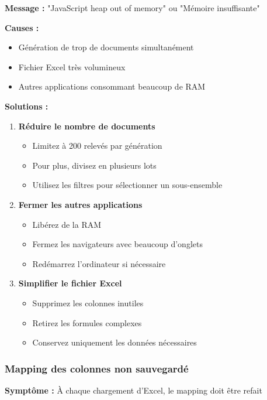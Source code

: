 \textbf{Message :} "JavaScript heap out of memory" ou "Mémoire insuffisante"

\textbf{Causes :}
\begin{itemize}[leftmargin=*]
    \item Génération de trop de documents simultanément
    \item Fichier Excel très volumineux
    \item Autres applications consommant beaucoup de RAM
\end{itemize}

\textbf{Solutions :}
\begin{enumerate}[leftmargin=*]
    \item \textbf{Réduire le nombre de documents}
    \begin{itemize}
        \item Limitez à 200 relevés par génération
        \item Pour plus, divisez en plusieurs lots
        \item Utilisez les filtres pour sélectionner un sous-ensemble
    \end{itemize}

    \item \textbf{Fermer les autres applications}
    \begin{itemize}
        \item Libérez de la RAM
        \item Fermez les navigateurs avec beaucoup d'onglets
        \item Redémarrez l'ordinateur si nécessaire
    \end{itemize}

    \item \textbf{Simplifier le fichier Excel}
    \begin{itemize}
        \item Supprimez les colonnes inutiles
        \item Retirez les formules complexes
        \item Conservez uniquement les données nécessaires
    \end{itemize}
\end{enumerate}

\subsubsection{Mapping des colonnes non sauvegardé}

\textbf{Symptôme :} À chaque chargement d'Excel, le mapping doit être refait

